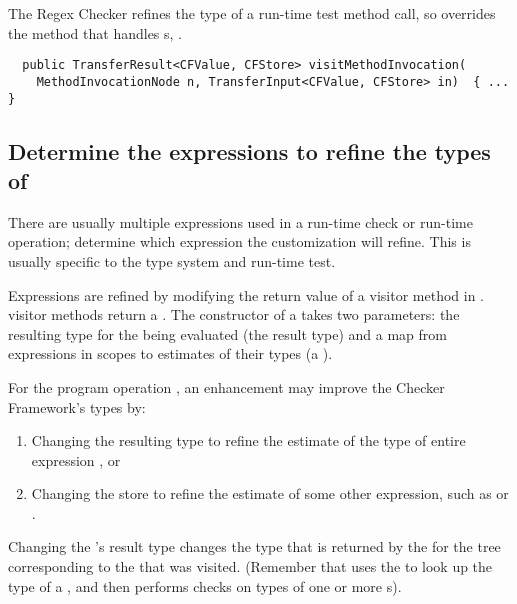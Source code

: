 The Regex Checker refines the type of a run-time test method call, so
 overrides the method that handles
s,
.

\begin{smaller}
\begin{Verbatim}
  public TransferResult<CFValue, CFStore> visitMethodInvocation(
    MethodInvocationNode n, TransferInput<CFValue, CFStore> in)  { ... }
\end{Verbatim}
\end{smaller}

\subsection{Determine the expressions to refine the types
of\label{dataflow-determine-expressions}}

There are usually multiple expressions used in a run-time check or run-time
operation; determine which expression the customization will refine.  This is
usually specific to the type system and run-time test.

Expressions are refined by modifying the return value of a visitor method in
.
 visitor methods return a
.  The constructor of a
 takes two parameters: the resulting
type for the  being evaluated (the result
type) and a map from expressions in scopes to estimates of their types (a
).

For the program operation , an enhancement may improve the Checker
Framework's types by:
\begin{enumerate}
\item Changing the resulting type to refine the estimate of the type of entire
    expression , or
\item Changing the store to refine the estimate of some other expression, such
    as  or .
\end{enumerate}

Changing the 's result type changes
the type that is returned by the 
for the tree corresponding to the  that was
visited.  (Remember that  uses the
 to look up the type of a
, and then performs checks on types of one or more
s).

